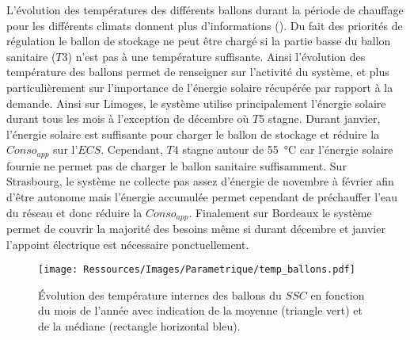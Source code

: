 L’évolution des températures des différents ballons durant la période de chauffage pour
les différents climats donnent plus d’informations (). Du
fait des priorités de régulation le ballon de stockage ne peut être chargé si la partie
basse du ballon sanitaire ($T3$) n’est pas à une température suffisante. Ainsi l’évolution
des température des ballons permet de renseigner sur l’activité du système, et plus
particulièrement sur l’importance de l’énergie solaire récupérée par rapport à la demande.
Ainsi sur Limoges, le système utilise principalement l’énergie solaire durant tous les
mois à l’exception de décembre où $T5$ stagne. Durant janvier, l’énergie solaire est
suffisante pour charger le ballon de stockage et réduire la $Conso_{app}$ sur
l’$ECS$. Cependant, $T4$ stagne autour de \SI{55}{\celsius} car l’énergie solaire fournie
ne permet pas de charger le ballon sanitaire suffisamment. Sur Strasbourg, le système ne
collecte pas assez d’énergie de novembre à février afin d’être autonome mais l’énergie
accumulée permet cependant de préchauffer l’eau du réseau et donc réduire la
$Conso_{app}$. Finalement sur Bordeaux le système permet de couvrir la majorité des besoins
même si durant décembre et janvier l’appoint électrique est nécessaire ponctuellement.

\begin{figure}
    \centering
    \texttt{[image: Ressources/Images/Parametrique/temp\_ballons.pdf]}
    \caption[Évolution des température internes des ballons du $SSC$]
            {Évolution des température internes des ballons du $SSC$ en fonction du mois
             de l’année avec indication de la moyenne (triangle vert) et
             de la médiane (rectangle horizontal bleu).
             \label{fig:temp_ballon_mensuel}}
\end{figure}


